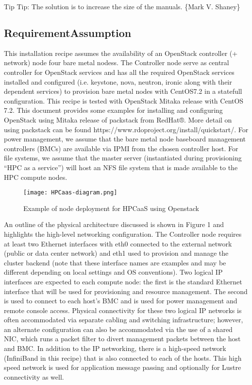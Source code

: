 \documentclass[12pt]{article}
\begin{document}
\small{Tip}
Tip: The solution is to increase the size of the manuals. \{Mark V. Shaney\}


\subsection*{RequirementAssumption}

This installation recipe assumes the availability of an OpenStack controller (+ network) node four bare metal nodess. The Controller node serve as central controller for OpenStack services and has all the required OpenStack services installed and configured (i.e. keystone, nova, neutron, ironic along with their dependent services) to provision bare metal nodes with CentOS7.2 in a statefull configuration. 
This recipe is tested with OpenStack Mitaka release with CentOS 7.2. This document provides some examples for installing and configuring OpenStack using Mitaka release of packstack from RedHat®. More detail on using packstack can be found https://www.rdoproject.org/install/quickstart/. 
For power management, we assume that the bare metal node baseboard management controllers (BMCs) are available via IPMI from the chosen controller host. For file systems, we assume that the master server (instantiated during provisioning “HPC as a service”) will host an NFS file system that is made available to the HPC compute nodes.

\begin{figure}
  \texttt{[image: HPCaas-diagram.png]}
  \caption{Example of node deployment for HPCaaS using Openstack}
  \label{fig:HPCaaS-diagram}
\end{figure}

An outline of the physical architecture discussed is shown in Figure 1 and highlights the high-level
networking configuration. The Controller node requires at least two Ethernet interfaces with eth0 connected to
the external network (public or data center network) and eth1 used to provision and manage the cluster backend (note that these interface names are examples and may be different depending on local settings and OS conventions). Two logical IP interfaces are expected to each compute node: the first is the standard Ethernet interface that
will be used for provisioning and resource management. The second is used to connect to each host’s BMC
and is used for power management and remote console access. Physical connectivity for these two logical
IP networks is often accommodated via separate cabling and switching infrastructure; however, an alternate
configuration can also be accommodated via the use of a shared NIC, which runs a packet filter to divert
management packets between the host and BMC.
In addition to the IP networking, there is a high-speed network (InfiniBand in this recipe) that is also
connected to each of the hosts. This high speed network is used for application message passing and optionally
for Lustre connectivity as well.
\end{document}
